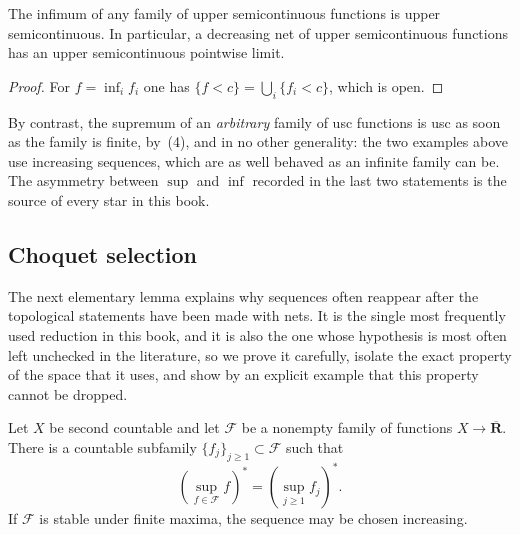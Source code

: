 \begin{lemma}
\label{lem:usc-inf}
The infimum of any family of upper semicontinuous functions is upper
semicontinuous.  In particular, a decreasing net of upper semicontinuous
functions has an upper semicontinuous pointwise limit.
\end{lemma}

\begin{proof}
For $f=\inf_i f_i$ one has
$\{f<c\}=\bigcup_i\{f_i<c\}$, which is open.
\end{proof}

By contrast, the supremum of an \emph{arbitrary} family of usc functions is
usc as soon as the family is finite, by
\,(4), and in no other generality: the two
examples above use increasing sequences, which are as well behaved as an
infinite family can be.  The asymmetry between $\sup$ and $\inf$ recorded in
the last two statements is the source of every star in this book.

\subsection{Choquet selection}

The next elementary lemma explains why sequences often reappear after the
topological statements have been made with nets.  It is the single most
frequently used reduction in this book, and it is also the one whose
hypothesis is most often left unchecked in the literature, so we prove it
carefully, isolate the exact property of the space that it uses, and show by
an explicit example that this property cannot be dropped.

\begin{lemma}\label{lem:choquet-selection}
Let $X$ be second countable and let $\mathcal F$ be a nonempty family of
functions $X\to\overline{\mathbf R}$.  There is a countable subfamily
$\{f_j\}_{j\geq1}\subset\mathcal F$ such that
\[
       \left(\sup_{f\in\mathcal F}f\right)^*
       =\left(\sup_{j\geq1}f_j\right)^*.
\]
If $\mathcal F$ is stable under finite maxima, the sequence may be chosen
increasing.
\end{lemma}

